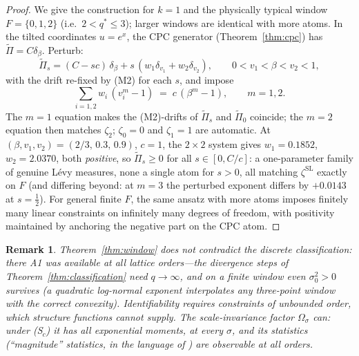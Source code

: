 \documentclass[pdflatex,sn-mathphys-num]{sn-jnl}
\theoremstyle{thmstyleone}
\theoremstyle{thmstyletwo}
\newtheorem*{remark}{Remark}
\theoremstyle{thmstylethree}
\begin{document}
\begin{proof}
We give the construction for $k = 1$ and the physically typical
window $F = \{0,1,2\}$ (i.e.\ $2 < q^* \le 3$); larger windows are
identical with more atoms.  In the tilted coordinates $u = e^{x}$,
the CPC generator (Theorem~\ref{thm:cpc}) has $\tilde\Pi = C
\delta_\beta$.  Perturb:
\[
  \tilde\Pi_s = (C - sc)\,\delta_\beta + s\,(w_1\delta_{v_1} +
  w_2\delta_{v_2}),
  \qquad 0 < v_1 < \beta < v_2 < 1,
\]
with the drift re-fixed by (M2) for each $s$, and impose
\[
  \sum_{i=1,2} w_i\,(v_i^m - 1) \;=\; c\,(\beta^m - 1),
  \qquad m = 1, 2 .
\]
The $m=1$ equation makes the (M2)-drifts of $\tilde\Pi_s$ and
$\tilde\Pi_0$ coincide; the $m=2$ equation then matches $\zeta_2$;
$\zeta_0 = 0$ and $\zeta_1 = 1$ are automatic.  At $(\beta, v_1,
v_2) = (2/3,\,0.3,\,0.9)$, $c = 1$, the $2\times2$ system gives
$w_1 = 0.1852$, $w_2 = 2.0370$, both \emph{positive}, so
$\tilde\Pi_s \ge 0$ for all $s \in [0, C/c]$: a one-parameter family
of genuine L\'evy measures, none a single atom for $s > 0$, all
matching $\zeta^{\mathrm{SL}}$ exactly on $F$ (and differing beyond:
at $m = 3$ the perturbed exponent differs by $+0.0143$ at
$s = \tfrac12$).  For general finite $F$, the same ansatz with more
atoms imposes finitely many linear constraints on infinitely many
degrees of freedom, with positivity maintained by anchoring the
negative part on the CPC atom.
\end{proof}

\begin{remark}
Theorem~\ref{thm:window} does not contradict the discrete
classification: there A1 was available at \emph{all} lattice
orders---the divergence steps of Theorem~\ref{thm:classification}
need $q \to \infty$, and on a finite window even $\sigma_0^2 > 0$
survives (a quadratic log-normal exponent interpolates any
three-point window with the correct convexity).  Identifiability
requires constraints of unbounded order, which structure functions
cannot supply.  The scale-invariance factor $\Omega_\sigma$ can:
under \textup{(S$_c$)} it has all exponential moments, at every
$\sigma$, and its statistics (``magnitude'' statistics, in the
language of \cite{DMA01}) are observable at all orders.
\end{remark}
\end{document}
